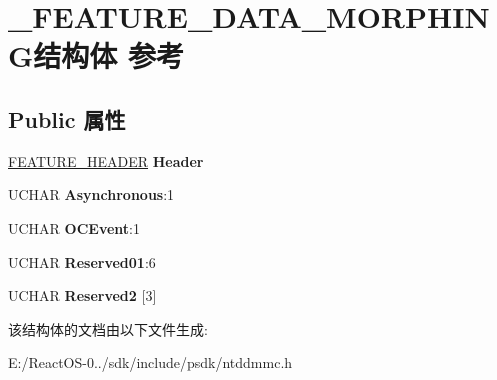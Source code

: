 \hypertarget{struct___f_e_a_t_u_r_e___d_a_t_a___m_o_r_p_h_i_n_g}{}\section{\+\_\+\+F\+E\+A\+T\+U\+R\+E\+\_\+\+D\+A\+T\+A\+\_\+\+M\+O\+R\+P\+H\+I\+N\+G结构体 参考}
\label{struct___f_e_a_t_u_r_e___d_a_t_a___m_o_r_p_h_i_n_g}
\subsection*{Public 属性}
\begin{DoxyCompactItemize}
\item 
\mbox{\label{struct___f_e_a_t_u_r_e___d_a_t_a___m_o_r_p_h_i_n_g_a1b65142b2f825f20e4b92383be1b2a33}} 
\hyperlink{struct___f_e_a_t_u_r_e___h_e_a_d_e_r}{F\+E\+A\+T\+U\+R\+E\+\_\+\+H\+E\+A\+D\+ER} {\bfseries Header}
\item 
\mbox{\label{struct___f_e_a_t_u_r_e___d_a_t_a___m_o_r_p_h_i_n_g_a2842a7844759b37bf01a9f6d574caf4b}} 
U\+C\+H\+AR {\bfseries Asynchronous}\+:1
\item 
\mbox{\label{struct___f_e_a_t_u_r_e___d_a_t_a___m_o_r_p_h_i_n_g_a6a0660407e57e54c0b9deb599e119003}} 
U\+C\+H\+AR {\bfseries O\+C\+Event}\+:1
\item 
\mbox{\label{struct___f_e_a_t_u_r_e___d_a_t_a___m_o_r_p_h_i_n_g_a14376384a778c15ef6c04b7d65e64d57}} 
U\+C\+H\+AR {\bfseries Reserved01}\+:6
\item 
\mbox{\label{struct___f_e_a_t_u_r_e___d_a_t_a___m_o_r_p_h_i_n_g_a512fd94e5480c4104745d537eaaab8ce}} 
U\+C\+H\+AR {\bfseries Reserved2} \mbox{[}3\mbox{]}
\end{DoxyCompactItemize}


该结构体的文档由以下文件生成\+:\begin{DoxyCompactItemize}
\item 
E\+:/\+React\+O\+S-\/0../sdk/include/psdk/ntddmmc.\+h\end{DoxyCompactItemize}
